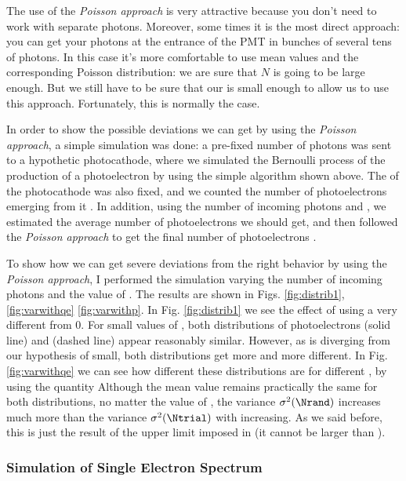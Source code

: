 The use of the \emph{Poisson approach} is very attractive because you
don't need to work with separate photons. Moreover, some times it is
the most direct approach: you can get your photons at the entrance of
the PMT in bunches of several tens of photons. In this case it's more
comfortable to use mean values and the corresponding Poisson
distribution: we are sure that $N$ is going to be large enough. But we
still have to be sure that our \QEo is small enough to allow us to use
this approach. Fortunately, this is normally the case.

In order to show the possible deviations we can get by using the
\emph{Poisson approach}, a simple simulation was done: a pre-fixed
number of photons \Nphot was sent to a hypothetic photocathode, where
we simulated the Bernoulli process of the production of a
photoelectron by using the simple algorithm shown above.  The \QEo of
the photocathode was also fixed, and we counted the number of
photoelectrons emerging from it \Ntrial.  In addition, using the
number of incoming photons and \QEo, we estimated the average number
of photoelectrons \Nmean we should get, and then followed the
\emph{Poisson approach} to get the final number of photoelectrons
\Nrand.

To show how we can get severe deviations from the right behavior by
using the \emph{Poisson approach}, I performed the simulation varying
the number of incoming photons and the value of \QEo. The results are
shown in Figs. \ref{fig:distrib1}, \ref{fig:varwithqe}
\ref{fig:varwithp}. In Fig. \ref{fig:distrib1} we see the effect of
using a \QEo very different from $0$. For small values of \QEo, both
distributions of photoelectrons \Ntrial (solid line) and \Nrand
(dashed line) appear reasonably similar. However, as \QEo is diverging
from our hypothesis of \QEo small, both distributions get more and
more different. In Fig. \ref{fig:varwithqe} we can see how different
these distributions are for different \QEo, by using the quantity
%
\varquoteq
%
Although the mean value remains practically the same for both
distributions, no matter the value of \QEo, the variance
$\sigma^2(\Nrand)$ increases much more than the variance
$\sigma^2(\Ntrial)$ with \QEo increasing. As we said before, this is
just the result of the upper limit imposed in \Ntrial (it cannot be
larger than \Nphot).

\subsubsection{Simulation of Single Electron Spectrum}

